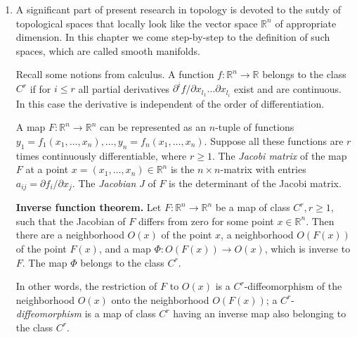 \documentclass{ctexart}
\newcommand{\Rn}{\mathbb{R}^n}
\begin{document}
\begin{enumerate}
\item A significant part of present research in topology is devoted to
  the sutdy of topological spaces that locally look like the vector
  space $\Rn$ of appropriate dimension. In this chapter we
  come step-by-step to the definition of such spaces, which are called
  smooth manifolds.

Recall some notions from calculus. A function $f : \Rn \to
\mathbb{R}$ belongs to the class $C^r$ if for $i \leq r$ all partial
derivatives $\partial^if/\partial x_{l_1}\dots\partial x_{l_i}$ exist
and are continuous. In this case the derivative is independent of the
order of differentiation.

A map $F : \Rn \to \Rn$ can be represented as an
$n$-tuple of functions $y_1 = f_1(x_1,\dots,x_n),\dots,y_n =
f_n(x_1,\dots,x_n)$. Suppose all these functions are $r$ times
continuously differentiable, where $r \geq 1$. The \textit{Jacobi
  matrix} of the map $F$ at a point $x = (x_1,\dots,x_n) \in
\Rn$ is the $n \times n$-matrix with entries $a_{ij}
= \partial f_i/\partial x_j$. The \textit{Jacobian} $J$ of $F$ is the
determinant of the Jacobi matrix.

\textbf{Inverse function theorem.} Let $F : \Rn \to \Rn$ be a map of
class $C^r, r \geq 1$, such that the Jacobian of $F$ differs from zero
for some point $x \in \Rn$. Then there are a neighborhood $O(x)$ of
the point $x$, a neighborhood $O(F(x))$ of the point $F(x)$, and a map
$\Phi : O(F(x)) \to O(x)$, which is inverse to $F$. The map $\Phi$
belongs to the class $C^r$.

In other words, the restriction of $F$ to $O(x)$ is a
$C^r$-diffeomorphism of the neighborhood $O(x)$ onto the neighborhood
$O(F(x))$; a $C^r$-\textit{diffeomorphism} is a map of class $C^r$
having an inverse map also belonging to the class $C^r$.
\end{enumerate}
\end{document}
